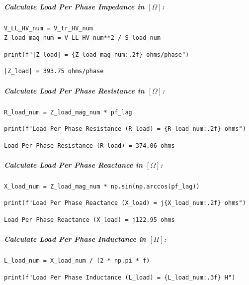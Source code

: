 \subparagraph{Calculate Load Per Phase Impedance in $\left[\Omega\right]$:}

\begin{verbatim}
V_LL_HV_num = V_tr_HV_num
Z_load_mag_num = V_LL_HV_num**2 / S_load_num
\end{verbatim}

\begin{verbatim}
print(f"|Z_load| = {Z_load_mag_num:.2f} ohms/phase")
\end{verbatim}

\begin{verbatim}
|Z_load| = 393.75 ohms/phase
\end{verbatim}

\subparagraph{Calculate Load Per Phase Resistance in $\left[\Omega\right]$:}

\begin{verbatim}
R_load_num = Z_load_mag_num * pf_lag
\end{verbatim}

\begin{verbatim}
print(f"Load Per Phase Resistance (R_load) = {R_load_num:.2f} ohms")
\end{verbatim}

\begin{verbatim}
Load Per Phase Resistance (R_load) = 374.06 ohms
\end{verbatim}

\subparagraph{Calculate Load Per Phase Reactance in $\left[\Omega\right]$:}

\begin{verbatim}
X_load_num = Z_load_mag_num * np.sin(np.arccos(pf_lag))
\end{verbatim}

\begin{verbatim}
print(f"Load Per Phase Reactance (X_load) = j{X_load_num:.2f} ohms")
\end{verbatim}

\begin{verbatim}
Load Per Phase Reactance (X_load) = j122.95 ohms
\end{verbatim}

\subparagraph{Calculate Load Per Phase Inductance in $\left[H\right]$:}

\begin{verbatim}
L_load_num = X_load_num / (2 * np.pi * f)
\end{verbatim}

\begin{verbatim}
print(f"Load Per Phase Inductance (L_load) = {L_load_num:.3f} H")
\end{verbatim}

